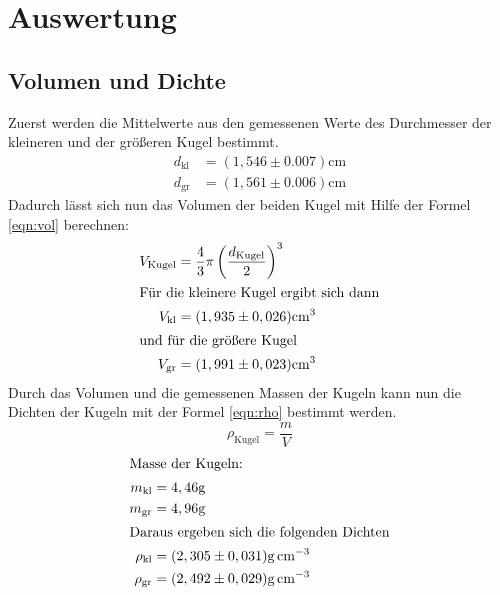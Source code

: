\section{Auswertung}
\label{sec:Auswertung}
\subsection{Volumen und Dichte}
\label{sec:Vol und Dich}
Zuerst werden die Mittelwerte aus den gemessenen Werte des Durchmesser der kleineren und der größeren Kugel bestimmt.
\begin{align*}
d_\mathrm{kl}&=(1,546\pm0.007)\si{\centi\meter}\\
d_\mathrm{gr}&=(1,561\pm0.006)\si{\centi\meter}
\end{align*}
Dadurch lässt sich nun das Volumen der beiden Kugel mit Hilfe der Formel \eqref{eqn:vol}
berechnen:
\begin{align*}
V_{\mathrm{Kugel}}&=\frac{4}{3}\pi \left(\frac{d_{\mathrm{Kugel}}}{2}\right)^3\label{eqn:vol}\\
\intertext{Für die kleinere Kugel ergibt sich dann}
V_{\mathrm{kl}}&=(1,935\pm0,026)\si{\cubic\centi\meter}\\
\intertext{und für die größere Kugel}
V_\mathrm{gr}&=(1,991\pm0,023)\si{\cubic\centi\meter}
\end{align*}
Durch das Volumen und die gemessenen Massen der Kugeln kann nun die Dichten der Kugeln mit der Formel \eqref{eqn:rho}
bestimmt werden.
\begin{equation}
 \rho_{\mathrm{Kugel}}=\frac{m}{V}\label{eqn:rho}
\end{equation}
\begin{align*}
\intertext{Masse der Kugeln:}
m_{\mathrm{kl}}&=4,46\si{\gram}\\
m_{\mathrm{gr}}&=4,96\si{\gram}\\
\intertext{Daraus ergeben sich die folgenden Dichten}
\rho_{\mathrm{kl}}&=(2,305\pm0,031)\si{\gram\per\cubic\centi\meter}\\
\rho_{\mathrm{gr}}&=(2,492\pm0,029)\si{\gram\per\cubic\centi\meter}
\end{align*}
